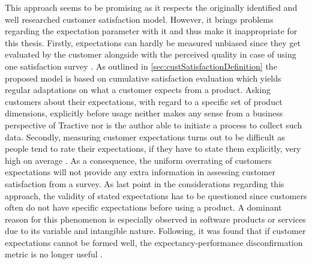 This approach seems to be promising as it respects the originally identified and well researched customer satisfaction model. However, it brings problems regarding the expectation parameter with it and thus make it inappropriate for this thesis. Firstly, expectations can hardly be measured unbiased since they get evaluated by the customer alongside with the perceived quality in case of using one satisfaction survey \cite{getty1995relationship}. As outlined in \ref{sec:custSatisfactionDefinition} the proposed model is based on cumulative satisfaction evaluation which yields regular adaptations on what a customer expects from a product. Asking customers about their expectations, with regard to a specific set of product dimensions, explicitly before usage neither makes any sense from a business perspective of Tractive nor is the author able to initiate a process to collect such data. Secondly, measuring customer expectations turns out to be difficult as people tend to rate their expectations, if they have to state them explicitly, very high on average \cite{babakus1992empirical}. As a consequence, the uniform overrating of customers expectations will not provide any extra information in assessing customer satisfaction from a survey. As last point in the considerations regarding this approach, the validity of stated expectations has to be questioned since customers often do not have specific expectations before using a product. A dominant reason for this phenomenon is especially observed in software products or services due to its variable and intangible nature. Following, it was found that if customer expectations cannot be formed well, the expectancy-performance disconfirmation metric is no longer useful \cite{halstead1994multisource}. 

